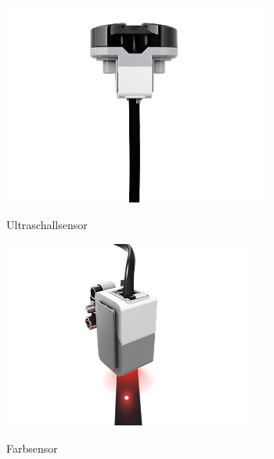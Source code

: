 \begin{figure}[hptb]
	\begin{subfigure}{.225\textwidth}
		\includegraphics[width=\textwidth]{images/ultrasonic.jpg}
		\\
		\caption{Ultraschallsensor}
		\label{fig:g1}
	\end{subfigure}%
	\hfill
	\begin{subfigure}{.225\textwidth}
		\includegraphics[width=\textwidth]{images/color.png}
		\\
		\caption{Farbsensor}
		\label{fig:g2}
	\end{subfigure}
	\hfill
	\begin{subfigure}{.225\textwidth}

\end{subfigure}
\end{figure}
